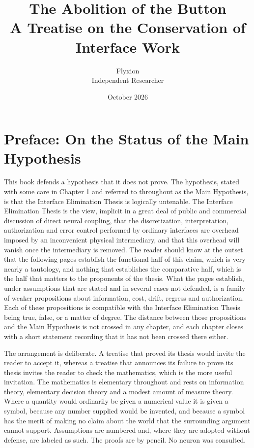 \documentclass[11pt,twoside,openany]{book}
\title{\Huge The Abolition of the Button\\[1.5ex]\Large A Treatise on the Conservation of Interface Work}
\author{Flyxion\\Independent Researcher}
\date{October 2026}
\theoremstyle{definition}
\theoremstyle{remark}
\begin{document}
\frontmatter
\maketitle

\chapter*{Preface: On the Status of the Main Hypothesis}

This book defends a hypothesis that it does not prove. The hypothesis, stated with some care in Chapter 1 and referred to throughout as the Main Hypothesis, is that the Interface Elimination Thesis is logically untenable. The Interface Elimination Thesis is the view, implicit in a great deal of public and commercial discussion of direct neural coupling, that the discretization, interpretation, authorization and error control performed by ordinary interfaces are overhead imposed by an inconvenient physical intermediary, and that this overhead will vanish once the intermediary is removed. The reader should know at the outset that the following pages establish the functional half of this claim, which is very nearly a tautology, and nothing that establishes the comparative half, which is the half that matters to the proponents of the thesis. What the pages establish, under assumptions that are stated and in several cases not defended, is a family of weaker propositions about information, cost, drift, regress and authorization. Each of these propositions is compatible with the Interface Elimination Thesis being true, false, or a matter of degree. The distance between those propositions and the Main Hypothesis is not crossed in any chapter, and each chapter closes with a short statement recording that it has not been crossed there either.

The arrangement is deliberate. A treatise that proved its thesis would invite the reader to accept it, whereas a treatise that announces its failure to prove its thesis invites the reader to check the mathematics, which is the more useful invitation. The mathematics is elementary throughout and rests on information theory, elementary decision theory and a modest amount of measure theory. Where a quantity would ordinarily be given a numerical value it is given a symbol, because any number supplied would be invented, and because a symbol has the merit of making no claim about the world that the surrounding argument cannot support. Assumptions are numbered and, where they are adopted without defense, are labeled as such. The proofs are by pencil. No neuron was consulted.
\end{document}
